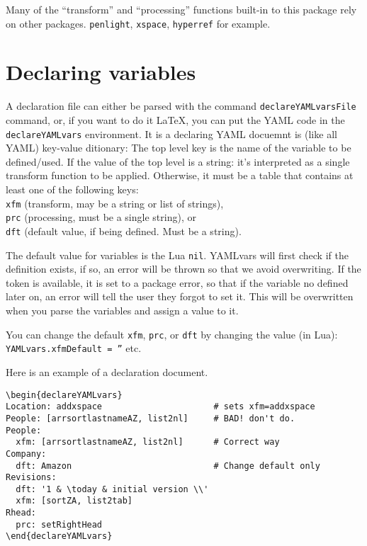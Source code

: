 \documentclass{article}
\begin{document}
Many of the ``transform'' and ``processing'' functions built-in to this package rely on other packages.
\texttt{penlight},
\texttt{xspace},
\texttt{hyperref} for example.

\section{Declaring variables}
A declaration file can either be parsed with the command \texttt{declareYAMLvarsFile} command,
or, if you want to do it \LaTeX, you can put the YAML code in the \texttt{declareYAMLvars} environment.
It is a declaring YAML docuemnt is (like all YAML) key-value ditionary:
The top level key is the name of the variable to be defined/used.
If the value of the top level is a string: it's interpreted as a single transform function to be applied.
Otherwise, it must
be a table that contains at least one of the following keys:\\
\texttt{xfm} (transform, may be a string or list of strings),\\
\texttt{prc} (processing, must be a single string), or \\
\texttt{dft} (default value, if being defined. Must be a string).

The default value for variables is the Lua \texttt{nil}.
YAMLvars will first check if the definition exists, if so, an error will be thrown
so that we avoid overwriting.
If the token is available, it is set to a package error, so that if the variable no defined later on, an error will
tell the user they forgot to set it.
This will be overwritten when you parse the variables and assign a value to it.

You can change the default \texttt{xfm}, \texttt{prc}, or \texttt{dft} by changing
the value (in Lua): \texttt{YAMLvars.xfmDefault = ''} etc.

Here is an example of a declaration document.
\begin{verbatim}
\begin{declareYAMLvars}
Location: addxspace                      # sets xfm=addxspace
People: [arrsortlastnameAZ, list2nl]     # BAD! don't do.
People:
  xfm: [arrsortlastnameAZ, list2nl]      # Correct way
Company:
  dft: Amazon                            # Change default only
Revisions:
  dft: '1 & \today & initial version \\'
  xfm: [sortZA, list2tab]
Rhead:
  prc: setRightHead
\end{declareYAMLvars}
\end{verbatim}
\end{document}
